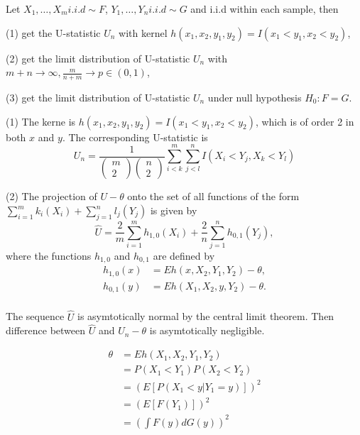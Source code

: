 \begin{problem}
Let $X_1,\ldots,X_m i.i.d\sim F$, $Y_1,\ldots,Y_n i.i.d \sim G$ and i.i.d within each sample, then

(1) get the U-statistic $U_n$ with kernel $h(x_1,x_2,y_1,y_2)=I(x_1<y_1,x_2<y_2)$,

(2) get the limit distribution of U-statistic $U_n$ with $m+n\rightarrow\infty, \frac{m}{n+m}\rightarrow p\in (0,1)$,

(3) get the limit distribution of U-statistic $U_n$ under null hypothesis $H_0:F=G$.

\end{problem}


\begin{solution}
(1) The kerne is $h(x_1,x_2,y_1,y_2)=I(x_1<y_1,x_2<y_2)$, which is of order 2 in both $x$ and $y$. The corresponding U-statistic is
\begin{equation*}
    U_n=\frac{1}{\left( \begin{matrix} m \\ 2 \end{matrix} \right) \left( \begin{matrix} n \\ 2 \end{matrix} \right)} \sum_{i<k}^m \sum_{j<l}^n  I(X_i<Y_j,X_k<Y_l)
\end{equation*}

(2) The projection of $U-\theta$ onto the set of all functions of the form $\sum_{i=1}^m k_i (X_i) + \sum_{j=1}^n l_j(Y_j)$ is given by 
\begin{equation*}
    \hat{U} = \frac{2}{m} \sum_{i=1}^m h_{1,0} (X_i) + \frac{2}{n} \sum_{j=1}^n h_{0,1} (Y_j),
\end{equation*}
where the functions $h_{1,0}$ and $h_{0,1}$ are defined by
\begin{equation*}
    \begin{split}
        h_{1,0}(x) & = Eh(x,X_2,Y_1,Y_2) - \theta, \\
        h_{0,1}(y) & = Eh(X_1,X_2,y,Y_2) - \theta. \\
    \end{split}
\end{equation*}

The sequence $\hat{U}$ is asymtotically normal by the central limit theorem. Then difference between $\hat{U}$ and $U_n-\theta$ is asymtotically negligible. 

\begin{equation*}
    \begin{split}
        \theta & = Eh(X_1, X_2, Y_1, Y_2)  \\
        & =  P(X_1 <Y_1)P(X_2<Y_2) \\
        & = (E [P(X_1 < y | Y_1 = y)] )^2 \\
        & =  (E [F(Y_1)])^2 \\
        & = \left(\int F(y) d G(y) \right)^2
    \end{split}
\end{equation*}


\end{solution}
